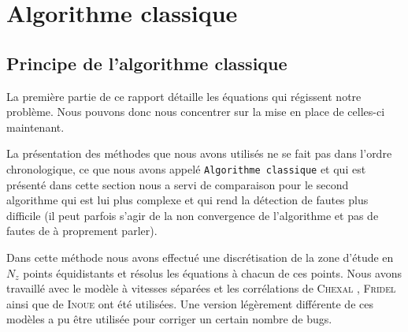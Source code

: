 \section{Algorithme classique\label{section:algo_clas}}

\subsection{Principe de l'algorithme classique}

La première partie de ce rapport détaille les équations qui régissent notre problème. Nous pouvons donc nous concentrer sur la mise en place de celles-ci maintenant.\\ \par 
La présentation des méthodes que nous avons utilisés ne se fait pas dans l'ordre chronologique, ce que nous avons appelé \texttt{Algorithme classique} et qui est présenté dans cette section nous a servi de comparaison pour le second algorithme qui est lui plus complexe et qui rend la détection de fautes plus difficile (il peut parfois s'agir de la non convergence de l'algorithme et pas de fautes de à proprement parler).\\ \par
Dans cette méthode nous avons effectué une discrétisation de la zone d'étude en $N_z$ points équidistants et résolus les équations à chacun de ces points. Nous avons travaillé avec le modèle à vitesses séparées et les corrélations de \textsc{Chexal} \cite{chexalFullrangeDriftfluxCorrelation1986}, \textsc{Fridel} \cite{freidelImprovedFrictionPressure1979a} ainsi que de \textsc{Inoue} \cite{inoueInbundleVoidMeasurement1993} ont été utilisées. Une version légèrement différente de ces modèles \cite{revellinAdiabaticTwophaseFrictional2007} a pu être utilisée pour corriger un certain nombre de bugs. \\

